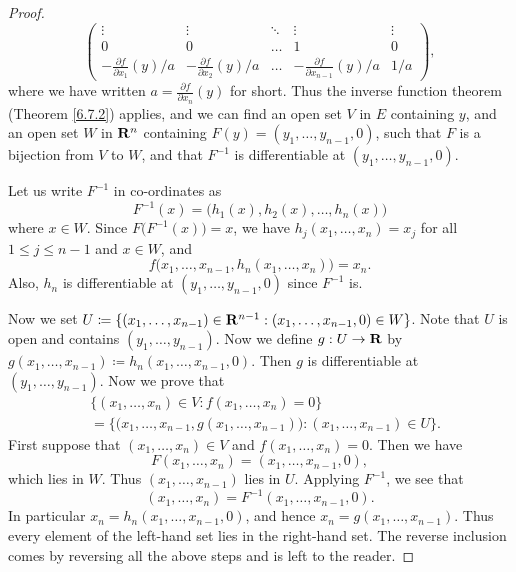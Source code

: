 \begin{proof}
\[\begin{pmatrix}
            \vdots                                  & \vdots                                  & \ddots & \vdots                                        & \vdots \\
            0                                       & 0                                       & \dots  & 1                                             & 0      \\
            -\frac{\partial f}{\partial x_1}(y) / a & -\frac{\partial f}{\partial x_2}(y) / a & \dots  & -\frac{\partial f}{\partial x_{n - 1}}(y) / a & 1 / a
        \end{pmatrix},
    \]
    where we have written \(a = \frac{\partial f}{\partial x_n}(y)\) for short.
    Thus the inverse function theorem (Theorem \ref{6.7.2}) applies, and we can find an open set \(V\) in \(E\) containing \(y\), and an open set \(W\) in \(\mathbf{R}^n\) containing \(F(y) = (y_1, \dots, y_{n - 1}, 0)\), such that \(F\) is a bijection from \(V\) to \(W\), and that \(F^{-1}\) is differentiable at \((y_1, \dots, y_{n - 1}, 0)\).

    Let us write \(F^{-1}\) in co-ordinates as
    \[
        F^{-1}(x) = \big(h_1(x), h_2(x), \dots, h_n(x)\big)
    \]
    where \(x \in W\).
    Since \(F\big(F^{-1}(x)\big) = x\), we have \(h_j(x_1, \dots, x_n) = x_j\) for all \(1 \leq j \leq n - 1\) and \(x \in W\), and
    \[
        f\big(x_1, \dots, x_{n - 1}, h_n(x_1, \dots, x_n)\big) = x_n.
    \]
    Also, \(h_n\) is differentiable at \((y_1, \dots, y_{n - 1}, 0)\) since \(F^{-1}\) is.

    Now we set \(U \coloneqq \{(x_1, \dots, x_{n - 1}) \in \mathbf{R}^{n - 1} : (x_1, \dots, x_{n - 1}, 0) \in W\}\).
    Note that \(U\) is open and contains \((y_1, \dots, y_{n - 1})\).
    Now we define \(g : U \to \mathbf{R}\) by \(g(x_1, \dots, x_{n - 1}) \coloneqq h_n(x_1, \dots, x_{n - 1}, 0)\).
    Then \(g\) is differentiable at \((y_1, \dots, y_{n - 1})\).
    Now we prove that
    \begin{align*}
         & \{(x_1, \dots, x_n) \in V : f(x_1, \dots, x_n) = 0\}                                                     \\
         & = \Big\{\big(x_1, \dots, x_{n - 1}, g(x_1, \dots, x_{n - 1})\big) : (x_1, \dots, x_{n - 1}) \in U\Big\}.
    \end{align*}
    First suppose that \((x_1, \dots, x_n) \in V\) and \(f(x_1, \dots, x_n) = 0\).
    Then we have
    \[
        F(x_1, \dots, x_n) = (x_1, \dots, x_{n - 1}, 0),
    \]
    which lies in \(W\).
    Thus \((x_1, \dots, x_{n - 1})\) lies in \(U\).
    Applying \(F^{-1}\), we see that
    \[
        (x_1, \dots, x_n) = F^{-1}(x_1, \dots, x_{n - 1}, 0).
    \]
    In particular \(x_n = h_n(x_1, \dots, x_{n - 1}, 0)\), and hence \(x_n = g(x_1, \dots, x_{n - 1})\).
    Thus every element of the left-hand set lies in the right-hand set.
    The reverse inclusion comes by reversing all the above steps and is left to the reader.


\end{proof}
